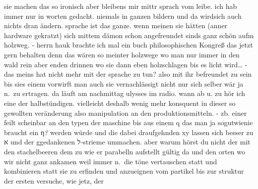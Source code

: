 \documentclass[
]{article}
\begin{document}
sie machen das so ironisch aber bleibens mir mittr sprach vom leibe. ich
hab immer nur in worten gedacht. niemals in ganzen bildern und da
wirdsich auch nichts dran ändern. sprache ist das ganze. wenn meinen sie
hätten (anner hardware gekratzt) sich mittem dämon schon angefreundet
sinds ganz schön aufm holzweg. - herrn hauk brachte ich mal ein buch
philosophischen Kongreß das jetzt gern behalten denn das wären so
meinter holzwege wo man nur immer in den wald rein aber enden drinnen wo
sie dann eben holzschlagen bis es licht wird\ldots{} - das meins hat
nicht mehr mit der sprache zu tun? also mit ihr befreundet zu sein bis
sies einem vorwirft man auch sie vernachlässigt nicht nur sich selber
wär ja n.~zu ertragen. da läuft am nachmittag ulysses im radio. wann ab
u. zu hör ich eine der halbstündigen. vielleicht deshalb wenig mehr
konsquent in dieser so gewollten veränderung also manipulation an den
produktionsmitteln. - zb. einer feilt scheinbar an den typen der
maschine bis aus einem q das man ja sogutwienie braucht ein η\emph{?}
werden würde und die dabei draufgehnden xy lassen sich besser zu א und
der ggedankenen ל\emph{-}strieme ummachen. aber warum hörst du nicht der
mit den stachelbeeren dem zu wie er parabelln aufstellt gültig da und
den orten wo wir nicht ganz ankamen weil immer n.~die töne vertauschen
statt und kombinieren statt sie zu erfinden und anzueignen vom partikel
bis zur struktur der ersten versuche, wie jetz, der
\end{document}
